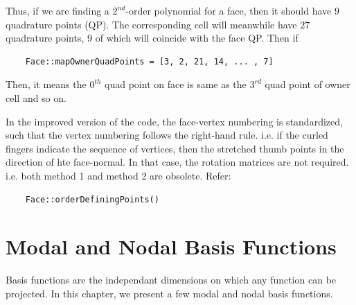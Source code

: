 Thus, if we are finding a $2^{nd}$-order polynomial for a face, then it should have $9$ quadrature points (QP).
The corresponding cell will meanwhile have $27$  quadrature points, $9$ of which will coincide with the face QP.
Then if 
\begin{verbatim}
	Face::mapOwnerQuadPoints = [3, 2, 21, 14, ... , 7]
\end{verbatim}
Then, it means the $0^{th}$ quad point on face is same as the $3^{rd}$ quad point of owner cell and so on. 


\begin{note}
	In the improved version of the code, the face-vertex numbering is standardized, such that the vertex numbering follows the right-hand rule.
	i.e. if the curled fingers indicate the sequence of vertices, then the stretched thumb points in the direction of hte face-normal.
	In that case, the rotation matrices are not required. i.e. both method 1 and method 2 are obsolete. 
	Refer:
	\begin{verbatim}
	Face::orderDefiningPoints()
	\end{verbatim}
\end{note}


\section{Modal and Nodal Basis Functions}
Basis functions are the independant dimensions on which any function can be projected. In this chapter, we present a few 
modal and nodal basis functions.

